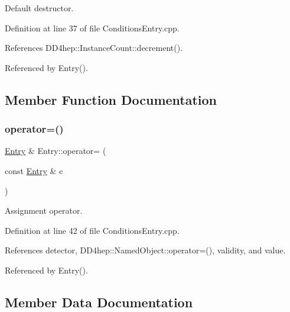 Default destructor. 



Definition at line 37 of file Conditions\+Entry.\+cpp.



References D\+D4hep\+::\+Instance\+Count\+::decrement().



Referenced by Entry().



\subsection{Member Function Documentation}
\hypertarget{class_d_d4hep_1_1_conditions_1_1_entry_a750c6f836c0cb9a0bb6975a8f1e9ee01}{}\label{class_d_d4hep_1_1_conditions_1_1_entry_a750c6f836c0cb9a0bb6975a8f1e9ee01} 
\subsubsection{\texorpdfstring{operator=()}{operator=()}}
{\footnotesize\ttfamily \hyperlink{class_d_d4hep_1_1_conditions_1_1_entry}{Entry} \& Entry\+::operator= (\begin{DoxyParamCaption}\item[{const \hyperlink{class_d_d4hep_1_1_conditions_1_1_entry}{Entry} \&}]{c }\end{DoxyParamCaption})}



Assignment operator. 



Definition at line 42 of file Conditions\+Entry.\+cpp.



References detector, D\+D4hep\+::\+Named\+Object\+::operator=(), validity, and value.



Referenced by Entry().



\subsection{Member Data Documentation}
\hypertarget{class_d_d4hep_1_1_conditions_1_1_entry_ae10613b25e5bc54df7d4ada0a2b774a9}{}\label{class_d_d4hep_1_1_conditions_1_1_entry_ae10613b25e5bc54df7d4ada0a2b774a9} 
